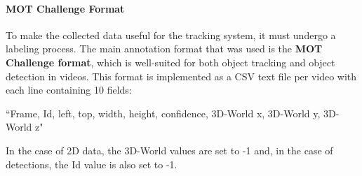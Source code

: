 
\paragraph{MOT Challenge Format}

{
    To make the collected data useful for the tracking system, it must undergo a labeling process. 
    The main annotation format that was used is the \textbf{\ac{MOT} Challenge format}\cite{MOTChallenge2015}, 
    which is well-suited for both object tracking and object detection in videos. 
    This format is implemented as a \ac{CSV} text file per video with each line containing 10 fields: 
}

\begin{center}
    {``Frame, Id, left, top, width, height, confidence, 3D-World x, 3D-World y, 3D-World z"}
\end{center}

{
    In the case of 2D data, the 3D-World values are set to -1 and, in the case of detections, the Id value is also set to -1.
}

%
%


